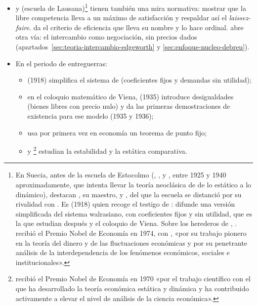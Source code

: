 \documentclass[11pt]{article}
\begin{document}
\begin{itemize}
\begin{itemize}
\begin{itemize}
  \item {} y  (escuela de Lausana)\footnote{En Suecia, antes de la escuela de Estocolmo (, ,  y , entre 1925 y 1940 aproximadamente, que intenta llevar la teoría neoclásica de  de lo estático a lo dinámico), destacan , su maestro, y , del que la escuela se distanció por su rivalidad con . Es  (1918) quien recoge el testigo de : difunde una versión simplificada del sistema walrasiano, con coeficientes fijos y sin utilidad, que es la que estudian después  y el coloquio de Viena\nocite{HET2026Swedish,HET2026Cassel,HET2026Wald}. Sobre los herederos de , \textcite[cap.~17]{EkelundHebert2013History}.  recibió el Premio Nobel de Economía en 1974, con , «por su trabajo pionero en la teoría del dinero y de las fluctuaciones económicas y por su penetrante análisis de la interdependencia de los fenómenos económicos, sociales e institucionales»\nocite{Nobel1974}.} tienen también una mira normativa: mostrar que la libre competencia lleva a un máximo de satisfacción y respaldar así el \emph{laissez-faire}. \textcite{Pareto1906Manuale} da el criterio de eficiencia que lleva su nombre y lo hace ordinal. \textcite{Edgeworth1881Mathematical} abre otra vía: el intercambio como negociación, sin precios dados (apartados~\ref{sec:teoria-intercambio-edgeworth} y \ref{sec:enfoque-nucleo-debreu}).
  \item En el periodo de entreguerras:
    \begin{itemize}
    \item {} (1918) simplifica el sistema de  (coeficientes fijos y demandas sin utilidad);
    \item en el coloquio matemático de Viena,  (1935) introduce desigualdades (bienes libres con precio nulo) y \textcite{Wald1936Gleichungssysteme} da las primeras demostraciones de existencia para ese modelo (1935 y 1936);
    \item \textcite{VonNeumann1937Gleichungssystem} usa por primera vez en economía un teorema de punto fijo;
    \item \textcite{Hicks1939Value} y \textcite{Samuelson1947Foundations}\footnote{ recibió el Premio Nobel de Economía en 1970 «por el trabajo científico con el que ha desarrollado la teoría económica estática y dinámica y ha contribuido activamente a elevar el nivel de análisis de la ciencia económica»\nocite{Nobel1970Samuelson}.} estudian la estabilidad y la estática comparativa.

\end{itemize}
\end{itemize}
\end{itemize}
\end{itemize}
\end{document}
